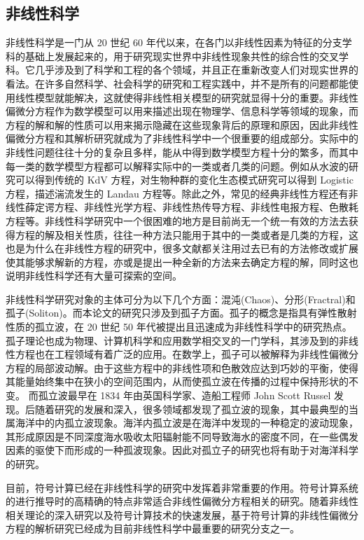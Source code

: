 \subsection{非线性科学}
非线性科学是一门从 20 世纪 60 年代以来，在各门以非线性因素为特征的分支学科的基础上发展起来的，用于研究现实世界中非线性现象共性的综合性的交叉学科。它几乎涉及到了科学和工程的各个领域，并且正在重新改变人们对现实世界的看法。在许多自然科学、社会科学的研究和工程实践中，并不是所有的问题都能使用线性模型就能解决，这就使得非线性相关模型的研究就显得十分的重要。非线性偏微分方程作为数学模型可以用来描述出现在物理学、信息科学等领域的现象，而方程的解和解的性质可以用来揭示隐藏在这些现象背后的原理和原因，因此非线性偏微分方程和其解析研究就成为了非线性科学中一个很重要的组成部分。实际中的非线性问题往往十分的复杂且多样，能从中得到数学模型方程十分的繁多，而其中每一类的数学模型方程都可以解释实际中的一类或者几类的问题。例如从水波的研究可以得到传统的 KdV 方程，对生物种群的变化生态模式研究可以得到 Logistic 方程，描述湍流发生的 Landau 方程等。除此之外，常见的经典非线性方程还有非线性薛定谔方程、非线性光学方程、非线性热传导方程、非线性电报方程、色散耗方程等。非线性科学研究中一个很困难的地方是目前尚无一个统一有效的方法去获得方程的解及相关性质，往往一种方法只能用于其中的一类或者是几类的方程，这也是为什么在非线性方程的研究中，很多文献都关注用过去已有的方法修改或扩展使其能够求解新的方程，亦或是提出一种全新的方法来去确定方程的解，同时这也说明非线性科学还有大量可探索的空间。

非线性科学研究对象的主体可分为以下几个方面：混沌(Chaos)、分形(Fractral)和孤子(Soliton)。而本论文的研究只涉及到孤子方面。孤子的概念是指具有弹性散射性质的孤立波，在 20 世纪 50 年代被提出且迅速成为非线性科学中的研究热点。孤子理论也成为物理、计算机科学和应用数学相交叉的一门学科，其涉及到的非线性方程也在工程领域有着广泛的应用。在数学上，孤子可以被解释为非线性偏微分方程的局部波动解。由于这些方程中的非线性项和色散效应达到巧妙的平衡，使得其能量始终集中在狭小的空间范围内，从而使孤立波在传播的过程中保持形状的不变。 而孤立波最早在 1834 年由英国科学家、造船工程师 John Scott Russel 发现。后随着研究的发展和深入，很多领域都发现了孤立波的现象，其中最典型的当属海洋中的内孤立波现象。海洋内孤立波是在海洋中发现的一种稳定的波动现象，其形成原因是不同深度海水吸收太阳辐射能不同导致海水的密度不同，在一些偶发因素的驱使下而形成的一种孤波现象。因此对孤立子的研究也将有助于对海洋科学的研究。

目前，符号计算已经在非线性科学的研究中发挥着非常重要的作用。符号计算系统的进行推导时的高精确的特点非常适合非线性偏微分方程相关的研究。随着非线性相关理论的深入研究以及符号计算技术的快速发展，基于符号计算的非线性偏微分方程的解析研究已经成为目前非线性科学中最重要的研究分支之一。

